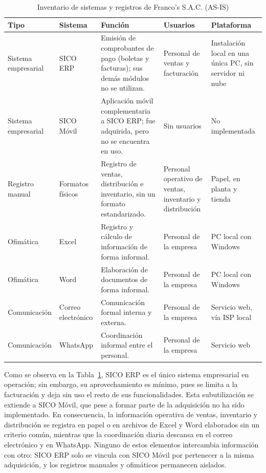 \begin{table}[H]
\centering
\caption{Inventario de sistemas y registros de Franco's S.A.C. (AS-IS)}
\label{tab:inventario-sistemas}
\small
\renewcommand{\arraystretch}{1.3}
\begin{tabularx}{\textwidth}{|>{\raggedright\arraybackslash}p{2.0cm}|>{\raggedright\arraybackslash}p{2.0cm}|X|>{\raggedright\arraybackslash}p{2.3cm}|>{\raggedright\arraybackslash}p{2.6cm}|}
\hline
\textbf{Tipo} & \textbf{Sistema} & \textbf{Función} & \textbf{Usuarios} & \textbf{Plataforma} \\
\hline
Sistema empresarial & SICO ERP & Emisión de comprobantes de pago (boletas y facturas); sus demás módulos no se utilizan. & Personal de ventas y facturación & Instalación local en una única PC, sin servidor ni nube \\
\hline
Sistema empresarial & SICO Móvil & Aplicación móvil complementaria a SICO ERP; fue adquirida, pero no se encuentra en uso. & Sin usuarios & No implementada \\
\hline
Registro manual & Formatos físicos & Registro de ventas, distribución e inventario, sin un formato estandarizado. & Personal operativo de ventas, inventario y distribución & Papel, en planta y tienda \\
\hline
Ofimática & Excel & Registro y cálculo de información de forma informal. & Personal de la empresa & PC local con Windows \\
\hline
Ofimática & Word & Elaboración de documentos de forma informal. & Personal de la empresa & PC local con Windows \\
\hline
Comunicación & Correo electrónico & Comunicación formal interna y externa. & Personal de la empresa & Servicio web, vía ISP local \\
\hline
Comunicación & WhatsApp & Coordinación informal entre el personal. & Personal de la empresa & Servicio web \\
\hline
\end{tabularx}
\end{table}

Como se observa en la Tabla~\ref{tab:inventario-sistemas}, SICO ERP es el único sistema empresarial en operación; sin embargo, su aprovechamiento es mínimo, pues se limita a la facturación y deja sin uso el resto de sus funcionalidades. Esta subutilización se extiende a SICO Móvil, que pese a formar parte de la adquisición no ha sido implementado. En consecuencia, la información operativa de ventas, inventario y distribución se registra en papel o en archivos de Excel y Word elaborados sin un criterio común, mientras que la coordinación diaria descansa en el correo electrónico y en WhatsApp. Ninguno de estos elementos intercambia información con otro: SICO ERP solo se vincula con SICO Móvil por pertenecer a la misma adquisición, y los registros manuales y ofimáticos permanecen aislados.

